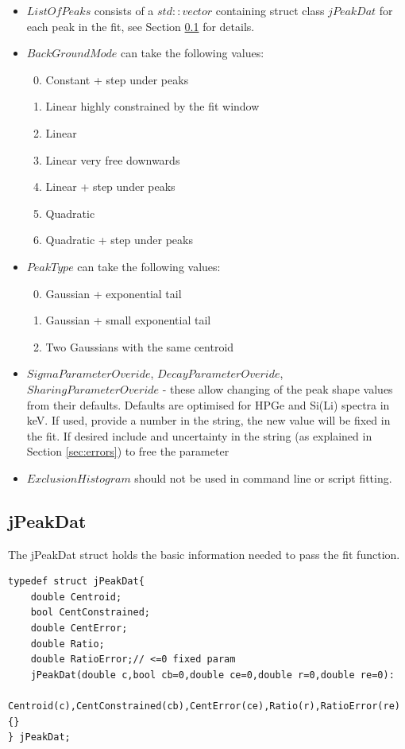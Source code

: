 \documentclass[a4paper,10pt]{article}
\begin{document}
\renewcommand{\labelenumi}{\arabic{enumi}}
\begin{itemize}
	\item $ListOfPeaks$ consists of a $std::vector$ containing struct class $jPeakDat$ for each peak in the fit, see Section \ref{sec:jpeakdata} for details.
	\item $BackGroundMode$ can take the following values:
      \begin{enumerate}
      \setcounter{enumi}{-1}
      \item Constant + step under peaks
      \item Linear highly constrained by the fit window
      \item Linear
      \item Linear very free downwards
      \item Linear + step under peaks
      \item Quadratic
      \item Quadratic + step under peaks
      \end{enumerate}
    \item $PeakType$ can take the following values:
      \begin{enumerate}
      \setcounter{enumi}{-1}
      \item Gaussian + exponential tail
      \item Gaussian + small exponential tail
      \item Two Gaussians with the same centroid 
      \end{enumerate}
    \item $SigmaParameterOveride$, $DecayParameterOveride$, $SharingParameterOveride$ - these allow changing of the peak shape values from their defaults. Defaults are optimised for HPGe and Si(Li) spectra in keV. If used, provide a number in the string, the new value will be fixed in the fit. If desired include and uncertainty in the string (as explained in Section \ref{sec:errors}) to free the parameter
    \item $ExclusionHistogram$ should not be used in command line or script fitting.   
\end{itemize}

\subsection{jPeakDat}\label{sec:jpeakdata}
The jPeakDat struct holds the basic information needed to pass the fit function.
\lstset{language=C++}
\begin{lstlisting}
typedef struct jPeakDat{
	double Centroid;
	bool CentConstrained;
	double CentError;
	double Ratio;
	double RatioError;// <=0 fixed param
	jPeakDat(double c,bool cb=0,double ce=0,double r=0,double re=0):
	Centroid(c),CentConstrained(cb),CentError(ce),Ratio(r),RatioError(re){}
} jPeakDat;
\end{lstlisting}
\end{document}
